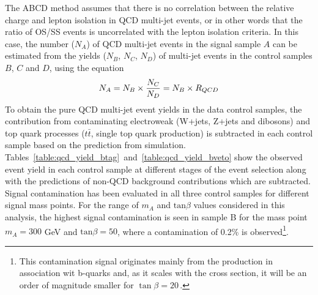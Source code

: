The ABCD method assumes that there is no correlation between the relative 
charge and lepton isolation in QCD multi-jet events, or in other words that the ratio of OS/SS events is uncorrelated 
with the lepton isolation criteria. In this case, the number ($N_{A}$) of QCD multi-jet events in the signal sample $A$ 
can be estimated from the yields ($N_B$, $N_C$, $N_D$)  of multi-jet events in the control samples $B$, $C$ and $D$, using the equation
\begin{equation} \label{eqn:qcdest}
N_{A}  = N_{B} \times \frac{N_{C}}{N_{D}} =  N_{B} \times R_{QCD}
\end{equation}
To obtain the pure QCD multi-jet event yields in the data control samples, the contribution 
from contaminating electroweak (W+jets, Z+jets and dibosons) and top quark processes
($t\bar{t}$,  single top quark production) is  subtracted in each control sample based 
on the prediction from simulation.
Tables~\ref{table:qcd_yield_btag}~and~\ref{table:qcd_yield_bveto}
show the observed event yield in each control sample at different stages of the event selection along with the
predictions of non-QCD background contributions  which are subtracted.
Signal contamination has been evaluated in all  three control samples for different signal 
mass points. For the range of $m_{A}$ and $\mathrm{tan}\beta$ values considered in this analysis, the highest signal contamination 
is seen in sample B for the mass point $m_{A} = 300$ GeV and $\mathrm{tan}\beta = 50$, where  a contamination 
of 0.2\% is observed\footnote{
This contamination signal originates mainly from the production in association wit b-quarks and,
as it scales with the cross section, it will be an order of magnitude smaller for $\tan\beta = 20\,.$
}.


